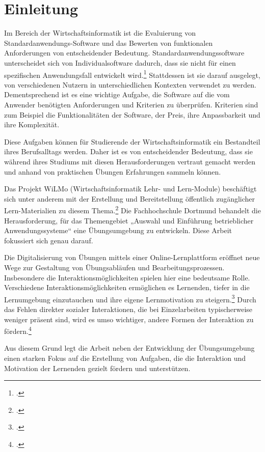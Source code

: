 \chapter{Einleitung}


Im Bereich der Wirtschaftsinformatik ist die Evaluierung von
Standardanwendungs-Software und das Bewerten von funktionalen Anforderungen von entscheidender Bedeutung.
Standardanwendungssoftware unterscheidet sich von Individualsoftware dadurch, dass sie nicht für einen spezifischen Anwendungsfall entwickelt wird.\footcite[Vgl.][S. 3]{Teich2008}{}{} Stattdessen ist sie darauf ausgelegt, von verschiedenen Nutzern in unterschiedlichen Kontexten verwendet zu werden.
Dementsprechend ist es eine wichtige Aufgabe, die Software auf die vom Anwender benötigten Anforderungen und Kriterien zu überprüfen. Kriterien sind zum Beispiel die Funktionalitäten der Software, der Preis, ihre Anpassbarkeit und ihre Komplexität.

Diese Aufgaben können für Studierende der Wirtschaftsinformatik ein Bestandteil ihres Berufsalltags  werden. Daher ist es von entscheidender Bedeutung, dass sie während ihres Studiums mit diesen Herausforderungen vertraut gemacht werden und anhand von praktischen Übungen Erfahrungen sammeln können.

Das Projekt WiLMo (Wirtschaftsinformatik Lehr- und Lern-Module) beschäftigt sich unter anderem mit der Erstellung und Bereitstellung öffentlich zugänglicher Lern-Materialien zu diesem Thema.\footcite[][]{wilmo}{}{}
Die Fachhochschule Dortmund behandelt die Herausforderung, für das Themengebiet „Auswahl und Einführung betrieblicher Anwendungssysteme“ eine Übungsumgebung zu entwickeln. Diese Arbeit fokussiert sich genau darauf.

Die Digitalisierung von Übungen mittels einer Online-Lernplattform eröffnet neue Wege zur Gestaltung von Übungsabläufen und Bearbeitungsprozessen.
Insbesondere die Interaktionsmöglichkeiten spielen hier eine bedeutsame Rolle.
Verschiedene Interaktionsmöglichkeiten ermöglichen es Lernenden, tiefer in die Lernumgebung einzutauchen und ihre eigene Lernmotivation zu steigern.\footcite[Vgl.][S.638]{BolognaDigital}{}{}
Durch das Fehlen direkter sozialer Interaktionen, die bei Einzelarbeiten typischerweise weniger präsent sind, wird es umso wichtiger, andere Formen der Interaktion zu fördern.\footcite[Vgl.][S.638]{BolognaDigital}{}{}

Aus diesem Grund legt die Arbeit neben der Entwicklung der Übungsumgebung einen starken Fokus auf die Erstellung von Aufgaben, die die Interaktion und Motivation der Lernenden gezielt fördern und unterstützen.

